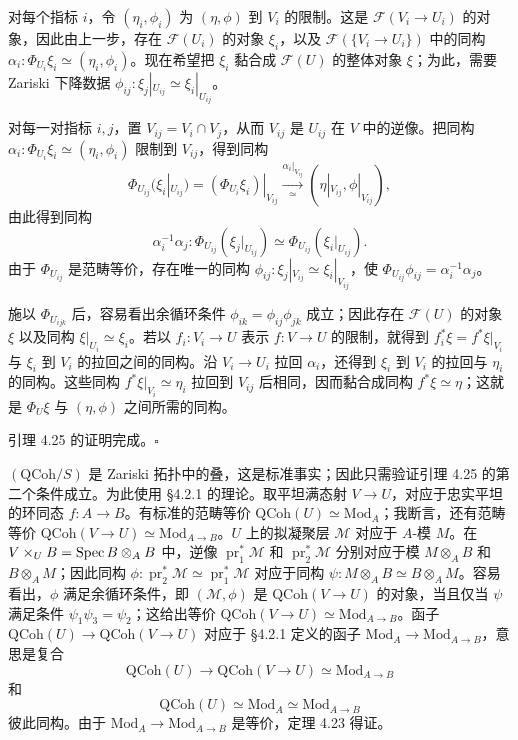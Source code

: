 对每个指标 $i$，令 $(\eta_i,\phi_i)$ 为 $(\eta,\phi)$ 到 $V_i$ 的限制。这是 $\mathcal F(V_i\to U_i)$ 的对象，因此由上一步，存在 $\mathcal F(U_i)$ 的对象 $\xi_i$，以及 $\mathcal F(\{V_i\to U_i\})$ 中的同构 $\alpha_i\colon\Phi_{U_i}\xi_i\simeq(\eta_i,\phi_i)$。现在希望把 $\xi_i$ 黏合成 $\mathcal F(U)$ 的整体对象 $\xi$；为此，需要 Zariski 下降数据 $\phi_{ij}\colon\xi_j|_{U_{ij}}\simeq\xi_i|_{U_{ij}}$。

对每一对指标 $i,j$，置 $V_{ij}=V_i\cap V_j$，从而 $V_{ij}$ 是 $U_{ij}$ 在 $V$ 中的逆像。把同构 $\alpha_i\colon\Phi_{U_i}\xi_i\simeq(\eta_i,\phi_i)$ 限制到 $V_{ij}$，得到同构
\[
 \Phi_{U_{ij}}(\xi_i|_{U_{ij}})=(\Phi_{U_i}\xi_i)|_{V_{ij}}
 \xrightarrow[\simeq]{\alpha_i|_{V_{ij}}}(\eta|_{V_{ij}},\phi|_{V_{ij}}),
\]
由此得到同构
\[
 \alpha_i^{-1}\alpha_j\colon\Phi_{U_{ij}}(\xi_j|_{U_{ij}})
 \simeq\Phi_{U_{ij}}(\xi_i|_{U_{ij}}).
\]
由于 $\Phi_{U_{ij}}$ 是范畴等价，存在唯一的同构
$\phi_{ij}\colon\xi_j|_{V_{ij}}\simeq\xi_i|_{V_{ij}}$，使 $\Phi_{U_{ij}}\phi_{ij}=\alpha_i^{-1}\alpha_j$。

施以 $\Phi_{U_{ijk}}$ 后，容易看出余循环条件 $\phi_{ik}=\phi_{ij}\phi_{jk}$ 成立；因此存在 $\mathcal F(U)$ 的对象 $\xi$ 以及同构 $\xi|_{U_i}\simeq\xi_i$。若以 $f_i\colon V_i\to U$ 表示 $f\colon V\to U$ 的限制，就得到 $f_i^*\xi=f^*\xi|_{V_i}$ 与 $\xi_i$ 到 $V_i$ 的拉回之间的同构。沿 $V_i\to U_i$ 拉回 $\alpha_i$，还得到 $\xi_i$ 到 $V_i$ 的拉回与 $\eta_i$ 的同构。这些同构 $f^*\xi|_{V_i}\simeq\eta_i$ 拉回到 $V_{ij}$ 后相同，因而黏合成同构 $f^*\xi\simeq\eta$；这就是 $\Phi_U\xi$ 与 $(\eta,\phi)$ 之间所需的同构。

引理 4.25 的证明完成。\hfill$\square$

$(\mathrm{QCoh}/S)$ 是 Zariski 拓扑中的叠，这是标准事实；因此只需验证引理 4.25 的第二个条件成立。为此使用 §4.2.1 的理论。取平坦满态射 $V\to U$，对应于忠实平坦的环同态 $f\colon A\to B$。有标准的范畴等价 $\mathrm{QCoh}(U)\simeq\mathrm{Mod}_A$；我断言，还有范畴等价 $\mathrm{QCoh}(V\to U)\simeq\mathrm{Mod}_{A\to B}$。$U$ 上的拟凝聚层 $\mathcal M$ 对应于 $A$-模 $M$。在 $V\times_U B=\operatorname{Spec} B\otimes_A B$ 中，逆像 $\operatorname{pr}_1^*\mathcal M$ 和 $\operatorname{pr}_2^*\mathcal M$ 分别对应于模 $M\otimes_A B$ 和 $B\otimes_A M$；因此同构 $\phi\colon\operatorname{pr}_2^*\mathcal M\simeq\operatorname{pr}_1^*\mathcal M$ 对应于同构 $\psi\colon M\otimes_A B\simeq B\otimes_A M$。容易看出，$\phi$ 满足余循环条件，即 $(\mathcal M,\phi)$ 是 $\mathrm{QCoh}(V\to U)$ 的对象，当且仅当 $\psi$ 满足条件 $\psi_1\psi_3=\psi_2$；这给出等价 $\mathrm{QCoh}(V\to U)\simeq\mathrm{Mod}_{A\to B}$。函子 $\mathrm{QCoh}(U)\to\mathrm{QCoh}(V\to U)$ 对应于 §4.2.1 定义的函子 $\mathrm{Mod}_A\to\mathrm{Mod}_{A\to B}$，意思是复合
\[
 \mathrm{QCoh}(U)\longrightarrow\mathrm{QCoh}(V\to U)\simeq\mathrm{Mod}_{A\to B}
\]
和
\[
 \mathrm{QCoh}(U)\simeq\mathrm{Mod}_A\simeq\mathrm{Mod}_{A\to B}
\]
彼此同构。由于 $\mathrm{Mod}_A\to\mathrm{Mod}_{A\to B}$ 是等价，定理 4.23 得证。

